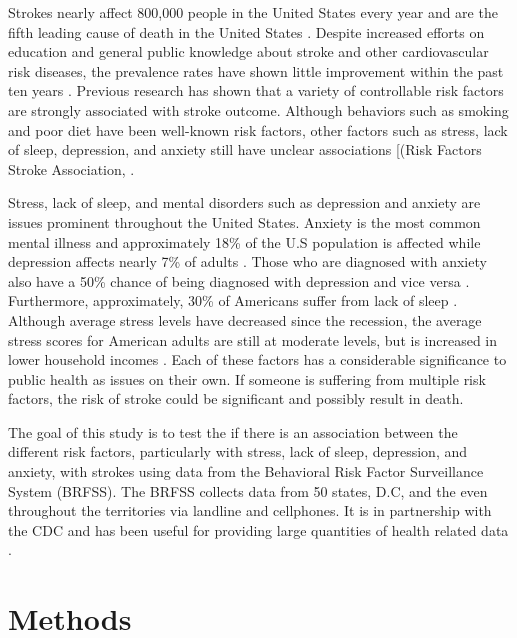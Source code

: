 \documentclass[11pt,]{article}
\begin{document}
Strokes nearly affect 800,000 people in the United States every year and
are the fifth leading cause of death in the United States
\citep{AmericanStrokeAssociation2017}. Despite increased efforts on
education and general public knowledge about stroke and other
cardiovascular risk diseases, the prevalence rates have shown little
improvement within the past ten years \citep{Mozaffarian2015}. Previous
research has shown that a variety of controllable risk factors are
strongly associated with stroke outcome. Although behaviors such as
smoking and poor diet have been well-known risk factors, other factors
such as stress, lack of sleep, depression, and anxiety still have
unclear associations {[}(Risk Factors Stroke Association,
\citep{AmericanStrokeAssociation2017a}.

Stress, lack of sleep, and mental disorders such as depression and
anxiety are issues prominent throughout the United States. Anxiety is
the most common mental illness and approximately 18\% of the U.S
population is affected while depression affects nearly 7\% of adults
\citep{AnxietyandDepressionAssociationofAmerica2017}. Those who are
diagnosed with anxiety also have a 50\% chance of being diagnosed with
depression and vice versa
\citep{AnxietyandDepressionAssociationofAmerica2017}. Furthermore,
approximately, 30\% of Americans suffer from lack of sleep
\citep{CentersforDiseaseControlandPrevention2015}. Although average
stress levels have decreased since the recession, the average stress
scores for American adults are still at moderate levels, but is
increased in lower household incomes
\citep{AmericanPsychologicalAssociation2015}. Each of these factors has
a considerable significance to public health as issues on their own. If
someone is suffering from multiple risk factors, the risk of stroke
could be significant and possibly result in death.

The goal of this study is to test the if there is an association between
the different risk factors, particularly with stress, lack of sleep,
depression, and anxiety, with strokes using data from the Behavioral
Risk Factor Surveillance System (BRFSS). The BRFSS collects data from 50
states, D.C, and the even throughout the territories via landline and
cellphones. It is in partnership with the CDC and has been useful for
providing large quantities of health related data
\citep{CentersforDiseaseControlandPrevention2014}.

\hypertarget{methods}{%
\section{Methods}\label{methods}}
\end{document}
